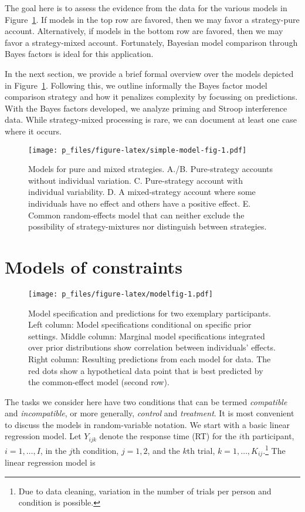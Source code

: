 \documentclass[english,man]{apa6}
\theoremstyle{definition}
\theoremstyle{definition}
\theoremstyle{remark}
\begin{document}
The goal here is to assess the evidence from the data for the various
models in Figure~\ref{fig:simple-model-fig}. If models in the top row
are favored, then we may favor a strategy-pure account. Alternatively,
if models in the bottom row are favored, then we may favor a
strategy-mixed account. Fortunately, Bayesian model comparison through
Bayes factors is ideal for this application.

In the next section, we provide a brief formal overview over the models
depicted in Figure~\ref{fig:simple-model-fig}. Following this, we
outline informally the Bayes factor model comparison strategy and how it
penalizes complexity by focussing on predictions. With the Bayes factors
developed, we analyze priming and Stroop interference data. While
strategy-mixed processing is rare, we can document at least one case
where it occurs.

\begin{figure}[htbp]
\centering
\texttt{[image: p\_files/figure-latex/simple-model-fig-1.pdf]}
\caption{\label{fig:simple-model-fig}Models for pure and mixed strategies.
A./B. Pure-strategy accounts without individual variation. C.
Pure-strategy account with individual variability. D. A mixed-strategy
account where some individuals have no effect and others have a positive
effect. E. Common random-effects model that can neither exclude the
possibility of strategy-mixtures nor distinguish between strategies.}
\end{figure}

\section{Models of constraints}\label{models-of-constraints}

\begin{figure}[htbp]
\centering
\texttt{[image: p\_files/figure-latex/modelfig-1.pdf]}
\caption{\label{fig:modelfig}Model specification and predictions for two
exemplary participants. Left column: Model specifications conditional on
specific prior settings. Middle column: Marginal model specifications
integrated over prior distributions show correlation between
individuals' effects. Right column: Resulting predictions from each
model for data. The red dots show a hypothetical data point that is best
predicted by the common-effect model (second row).}
\end{figure}

The tasks we consider here have two conditions that can be termed
\emph{compatible} and \emph{incompatible}, or more generally,
\emph{control} and \emph{treatment}. It is most convenient to discuss
the models in random-variable notation. We start with a basic linear
regression model. Let \(Y_{ijk}\) denote the response time (RT) for the
\(i\)th participant, \(i = 1, \ldots, I\), in the \(j\)th condition,
\(j = 1, 2\), and the \(k\)th trial,
\(k = 1, \ldots, K_{ij}\).\footnote{Due to data cleaning, variation in
  the number of trials per person and condition is possible.} The linear
regression model is
\end{document}
